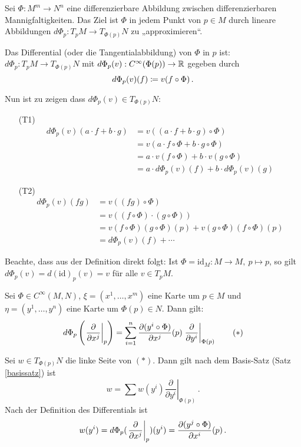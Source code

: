 \documentclass[a4paper,twoside,DIV15,BCOR12mm]{scrbook}
\begin{document}
Sei $\Phi:M^m\to N^n$ eine differenzierbare Abbildung zwischen differenzierbaren Mannigfaltigkeiten. Das Ziel ist $\Phi$ in jedem Punkt von $p\in M$ durch lineare Abbildungen $d\Phi_p: T_pM \to T_{\Phi(p)}N$ zu „approximieren“. 

\begin{definition}
Das Differential (oder die Tangentialabbildung) von $\Phi$ in $p$ ist:
$ d\Phi_p : T_pM \to T_{\Phi(p)}N $ mit $d\Phi_p(v) : C^\infty(\Phi(p)) \to \mathbb{R}$ gegeben durch
\[ d\Phi_p(v)(f) \da v(f \circ \Phi)\,. \]
\end{definition}

Nun ist zu zeigen dass $d\Phi_p(v) \in T_{\Phi(p)}N$:
\begin{itemize}
\item[(T1)]
\begin{align*}
d\Phi_p(v)(a\cdot f + b\cdot g) 
&= v( (a\cdot f+b\cdot g) \circ \Phi) \\
&=v(a\cdot f \circ \Phi + b\cdot g \circ \Phi) \\
&=a\cdot v(f\circ \Phi) + b\cdot v(g\circ \Phi) \\
&=a\cdot d\Phi_p(v)(f) + b\cdot d\Phi_p(v)(g)
\end{align*}
\item[(T2)]
\begin{align*}
d\Phi_p(v)(fg) 
&= v( (fg)\circ \Phi) \\
&= v( (f\circ \Phi)\cdot(g\circ\Phi) ) \\
&= v(f\circ \Phi)(g\circ \Phi)(p) + v(g\circ \Phi)(f\circ \Phi)(p) \\
&= d\Phi_p(v)(f) + \cdots 
\end{align*}
\end{itemize}

Beachte, dass aus der Definition direkt folgt: Ist $\Phi = \text{id}_M: M\to M,\> p\mapsto p$, so gilt $d\Phi_p(v) = d(\text{id})_p(v) = v$ für alle $v\in T_pM$.

\begin{lemma}
\label{lem3}
Sei $\Phi \in C^\infty(M,N)$, $\xi = (x^1,\ldots,x^m)$ eine Karte um $p\in M$ und $\eta = (y^1,\ldots,y^n)$ eine Karte um $\Phi(p)\in N$. Dann gilt:
\[
d\Phi_p\left(\left.\frac{\partial}{\partial x^{j}}\right|_p\right) = \sum_{i=1}^n \frac{ \partial(y^i\circ \Phi)}{\partial x^j}(p) \left.\frac{\partial}{\partial y^i}\right|_{\Phi(p)} \qquad (*)
\]
\end{lemma}

\begin{beweis}
Sei $w\in T_{\Phi(p)}N$ die linke Seite von $(*)$. Dann gilt nach dem Basis-Satz (Satz \ref{basissatz}) ist 
\[ w = \sum w(y^i) \left.\frac{\partial}{\partial y^i}\right|_{\Phi(p)}\,.\]
Nach der Definition des Differentials ist
\[ w(y^i) = d\Phi_p(\left.\frac{\partial}{\partial x^{j}}\right|_p)(y^i) = \frac{\partial(y^j\circ \Phi)}{\partial x^i}(p)\,.\]
\end{beweis}
\end{document}
